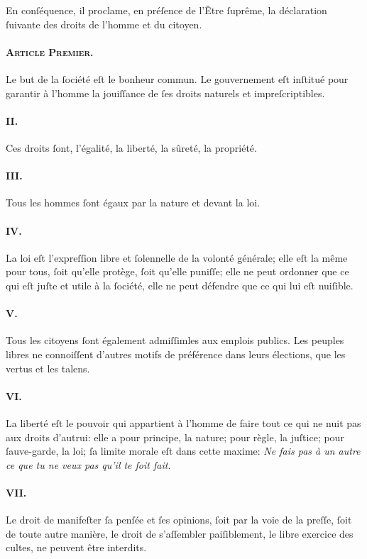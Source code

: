 \documentclass[10pt]{lecturenotes}
\begin{document}
En conſéquence, il proclame, en préſence de l'Être ſuprême, la déclaration ſuivante des droits de l'homme et du citoyen.
\paragraph*{\textsc{Article Premier.\\}}
Le but de la ſociété eſt le bonheur commun.
Le gouvernement eſt inſtitué pour garantir à l'homme la jouiſſance de ſes droits naturels et impreſcriptibles.
\paragraph*{II.} Ces droits ſont, l'égalité, la liberté, la sûreté, la propriété.
\paragraph*{III.}Tous les hommes ſont égaux par la nature et devant la loi.
\paragraph*{IV.}La loi eſt l'expreſſion libre et ſolennelle de la volonté générale; elle eſt la même pour tous, ſoit qu'elle protège, ſoit qu'elle puniſſe; elle ne peut ordonner que ce qui eſt juſte et utile à la ſociété, elle ne peut défendre que ce qui lui eſt nuiſible.
\paragraph*{V.}Tous les citoyens ſont également admiſſimles aux emplois publics. Les peuples libres ne connoiſſent d'autres motifs de préférence dans leurs élections, que les vertus et les talens.
\paragraph*{VI.}La liberté eſt le pouvoir qui appartient à l'homme de faire tout ce qui ne nuit pas aux droits d'autrui: elle a pour principe, la nature; pour règle, la juſtice; pour ſauve-garde, la loi; ſa limite morale eſt dans cette maxime: \emph{Ne fais pas à un autre ce que tu ne veux pas qu'il te ſoit fait}.
\paragraph*{VII.}Le droit de manifeſter ſa penſée et ſes opinions, ſoit par la voie de la preſſe, ſoit de toute autre manière, le droit de s'aſſembler paiſiblement, le libre exercice des  cultes, ne peuvent être interdits.
\end{document}
